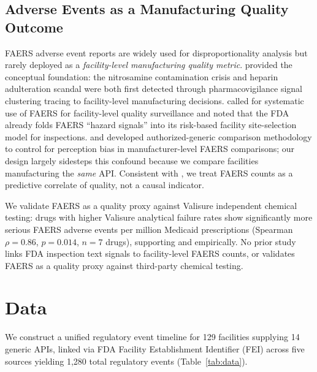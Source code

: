 \documentclass[12pt]{article}
\begin{document}
\subsection{Adverse Events as a Manufacturing Quality Outcome}

FAERS adverse event reports are widely used for disproportionality analysis
but rarely deployed as a \emph{facility-level manufacturing quality metric}.
\citet{Sardella2021} provided the conceptual foundation: the nitrosamine
contamination crisis and heparin adulteration scandal were both first detected
through pharmacovigilance signal clustering tracing to facility-level
manufacturing decisions.
\citet{Brown2020} called for systematic use of FAERS for facility-level
quality surveillance and noted that the FDA already folds FAERS ``hazard
signals'' into its risk-based facility site-selection model for inspections.
\citet{Rahman2017FAERS} and \citet{Alatawi2018} developed authorized-generic
comparison methodology to control for perception bias in manufacturer-level
FAERS comparisons; our design largely sidesteps this confound because we
compare facilities manufacturing the \emph{same} API.
Consistent with \citet{Potter2025}, we treat FAERS counts as a predictive
correlate of quality, not a causal indicator.

We validate FAERS as a quality proxy against Valisure independent chemical
testing: drugs with higher Valisure analytical failure rates show
significantly more serious FAERS adverse events per million Medicaid
prescriptions (Spearman $\rho = 0.86$, $p = 0.014$, $n = 7$ drugs),
supporting \citet{Brown2020} and \citet{Sardella2021} empirically.
No prior study links FDA inspection text signals to facility-level FAERS
counts, or validates FAERS as a quality proxy against third-party chemical
testing.

\section{Data}
\label{sec:data}

We construct a unified regulatory event timeline for 129 facilities supplying
14 generic APIs, linked via FDA Facility Establishment Identifier (FEI) across
five sources yielding 1,280 total regulatory events (Table~\ref{tab:data}).
\end{document}
